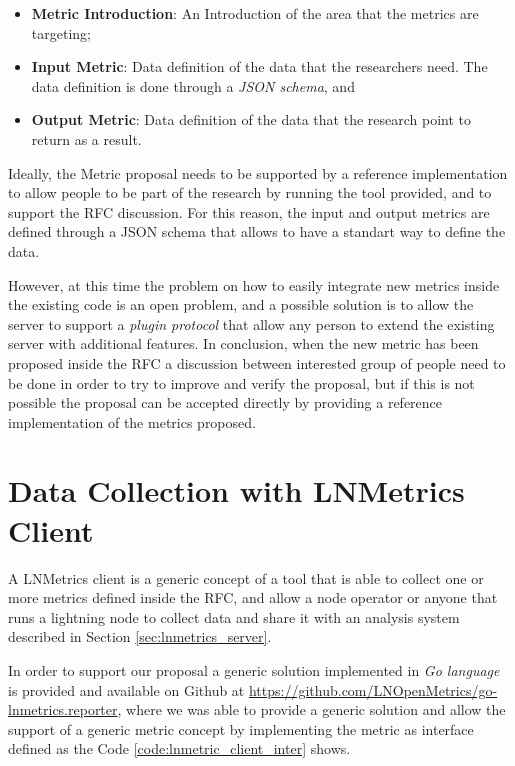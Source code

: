\begin{itemize}
    \item {\bf Metric Introduction}: An Introduction of the area that the metrics are targeting;
    \item {\bf Input Metric}: Data definition of the data that the researchers need. The data definition is done through a \emph{JSON schema}, and
    \item {\bf Output Metric}: Data definition of the data that the research point to return as a result. 
\end{itemize}

Ideally, the Metric proposal needs to be supported by a reference implementation to 
allow people to be part of the research by running the tool provided, and 
to support the RFC discussion.
For this reason, the input and output metrics are defined through a JSON schema 
that allows to have a standart way to define the data.

However, at this time the problem on how to easily integrate new metrics inside the 
existing code is an open problem, and a possible solution is to allow the server 
to support a \emph{plugin protocol} that allow any person to extend the existing 
server with additional features.
In conclusion, when the new metric has been proposed inside the RFC a discussion between interested 
group of people need to be done in order to try to improve and verify the proposal, but if this is not possible
the proposal can be accepted directly by providing a reference implementation of the metrics proposed.

\section{Data Collection with LNMetrics Client}
\label{sec:lnmetrics_client}

A LNMetrics client is a generic concept of a tool that is able to collect one or more metrics 
defined inside the RFC, and allow a node operator or anyone that runs a lightning node
to collect data and share it with an analysis system described in Section \ref{sec:lnmetrics_server}.

In order to support our proposal a generic solution implemented in \emph{Go language} is provided 
and available on Github at \url{https://github.com/LNOpenMetrics/go-lnmetrics.reporter}, where we was able 
to provide a generic solution and allow the support of a generic metric concept 
by implementing the metric as interface defined as the Code \ref{code:lnmetric_client_inter} shows.

